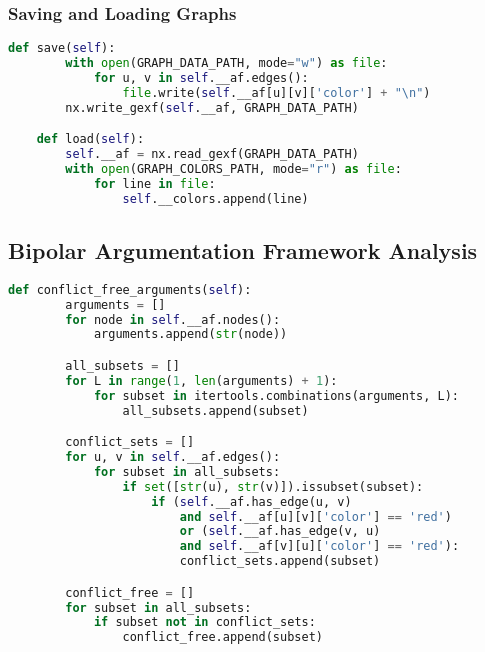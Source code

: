             \subsubsection{Saving and Loading Graphs}
            
                \begin{lstlisting}[language=Python, caption=Saving and Loading Argument Frameworks, label=code:afsaveload]
    def save(self):
        with open(GRAPH_DATA_PATH, mode="w") as file:
            for u, v in self.__af.edges():
                file.write(self.__af[u][v]['color'] + "\n")
        nx.write_gexf(self.__af, GRAPH_DATA_PATH)

    def load(self):
        self.__af = nx.read_gexf(GRAPH_DATA_PATH)
        with open(GRAPH_COLORS_PATH, mode="r") as file:
            for line in file:
                self.__colors.append(line)
                \end{lstlisting}
    
    \subsection{Bipolar Argumentation Framework Analysis} \label{bapanalysis}
        
        \begin{lstlisting}[language=Python, caption=Conflict Free Arguments, label=code:conflictfree]
    def conflict_free_arguments(self):
        arguments = []
        for node in self.__af.nodes():
            arguments.append(str(node))

        all_subsets = []
        for L in range(1, len(arguments) + 1):
            for subset in itertools.combinations(arguments, L):
                all_subsets.append(subset)

        conflict_sets = []
        for u, v in self.__af.edges():
            for subset in all_subsets:
                if set([str(u), str(v)]).issubset(subset):
                    if (self.__af.has_edge(u, v) 
                        and self.__af[u][v]['color'] == 'red') 
                        or (self.__af.has_edge(v, u) 
                        and self.__af[v][u]['color'] == 'red'):
                        conflict_sets.append(subset)

        conflict_free = []
        for subset in all_subsets:
            if subset not in conflict_sets:
                conflict_free.append(subset)
            \end{lstlisting}
        
